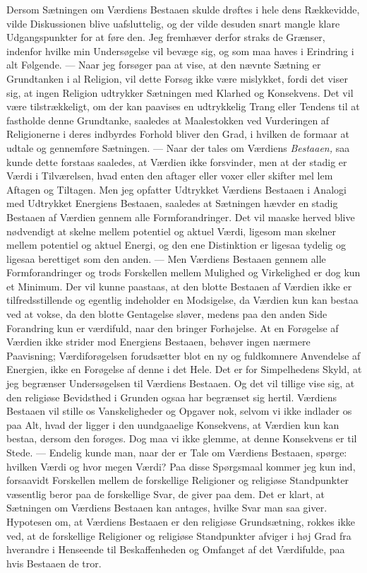 \documentclass[12pt,a4paper,openany]{book}
\newcommand{\opage}[1]{\marginnote{\footnotesize\textit{[#1]}}}
\begin{document}
Dersom Sætningen om Værdiens Bestaaen skulde drøftes i hele dens
Rækkevidde, vilde Diskussionen blive uafsluttelig, og der vilde desuden
snart mangle klare Udgangspunkter for at føre den. Jeg fremhæver derfor
straks de Grænser, indenfor hvilke min Undersøgelse vil bevæge sig, og
som maa haves i Erindring i alt Følgende. --- Naar jeg forsøger paa at
vise, at den nævnte Sætning er Grundtanken i al Religion, vil dette
Forsøg ikke være mislykket, fordi det viser sig, at ingen Religion
udtrykker Sætningen med Klarhed og Konsekvens. Det vil være
tilstrækkeligt, om der kan paavises en udtrykkelig Trang eller Tendens
til at fastholde denne Grundtanke, saaledes at Maalestokken ved
Vurderingen af Religionerne i deres indbyrdes Forhold bliver den Grad, i
hvilken de formaar at udtale og gennemføre Sætningen. --- Naar der tales
om Værdiens \textit{Bestaaen,} saa kunde dette forstaas saaledes, at
Værdien ikke forsvinder, men at der stadig er Værdi i Tilværelsen, hvad
enten den aftager eller voxer eller skifter mel%
\opage{10}lem Aftagen og Tiltagen. Men jeg opfatter Udtrykket Værdiens
Bestaaen i Analogi med Udtrykket Energiens Bestaaen, saaledes at
Sætningen hævder en stadig Bestaaen af Værdien gennem alle
Formforandringer. Det vil maaske herved blive nødvendigt at skelne
mellem potentiel og aktuel Værdi, ligesom man skelner mellem potentiel
og aktuel Energi, og den ene Distinktion er ligesaa tydelig og ligesaa
berettiget som den anden. --- Men Værdiens Bestaaen gennem alle
Formforandringer og trods Forskellen mellem Mulighed og Virkelighed er
dog kun et Minimum. Der vil kunne paastaas, at den blotte Bestaaen af
Værdien ikke er tilfredsstillende og egentlig indeholder en Modsigelse,
da Værdien kun kan bestaa ved at vokse, da den blotte Gentagelse sløver,
medens paa den anden Side Forandring kun er værdifuld, naar den bringer
Forhøjelse. At en Forøgelse af Værdien ikke strider mod Energiens
Bestaaen, behøver ingen nærmere Paavisning; Værdiforøgelsen forudsætter
blot en ny og fuldkomnere Anvendelse af Energien, ikke en Forøgelse af
denne i det Hele. Det er for Simpelhedens Skyld, at jeg begrænser
Undersøgelsen til Værdiens Bestaaen. Og det vil tillige vise sig, at den
religiøse Bevidsthed i Grunden ogsaa har begrænset sig hertil. Værdiens
Bestaaen vil stille os Vanskeligheder og Opgaver nok, selvom vi ikke
indlader os paa Alt, hvad der ligger i den uundgaaelige Konsekvens, at
Værdien kun kan bestaa, dersom den forøges. Dog maa vi ikke glemme, at
denne Konsekvens er til Stede. --- Endelig kunde man, naar der er Tale
om Værdiens Bestaaen, spørge: hvilken Værdi og hvor megen Værdi? Paa
disse Spørgsmaal kommer jeg kun ind, forsaavidt Forskellen mellem de
forskellige Religioner og religiøse Standpunkter væsentlig beror paa de
forskellige Svar, de giver paa dem. Det er klart, at Sætningen om
Værdiens Bestaaen kan antages, hvilke Svar man saa giver. Hypotesen om,
at Værdiens Bestaaen er den religiøse Grundsætning, rokkes ikke ved, at
de forskellige Religioner og religiøse Standpunkter afviger i høj Grad
fra hverandre i Henseende til Beskaffenheden og Omfanget af det
Værdifulde, paa hvis Bestaaen de tror.
\end{document}
